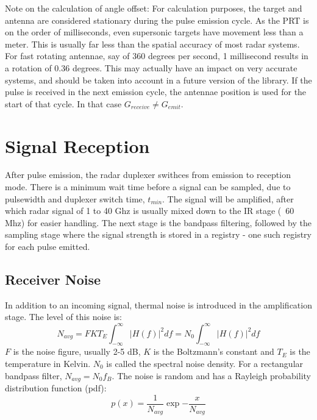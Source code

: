 \documentclass[letterpaper]{book}
\begin{document}
Note on the calculation of angle offset: For calculation purposes, the target and antenna are considered stationary during the pulse emission cycle. As the PRT is on the order of milliseconds, even supersonic targets have movement less than a meter. This is usually far less than the spatial accuracy of most radar systems. For fast rotating antennae, say of 360 degrees per second, 1 millisecond results in a rotation of 0.36 degrees. This may actually have an impact on very accurate systems, and should be taken into account in a future version of the library. If the pulse is received in the next emission cycle, the antennae position is used for the start of that cycle. In that case \(G_{receive} \neq G_{emit}\). 

\section{Signal Reception}
After pulse emission, the radar duplexer swithces from emission to reception mode. There is a minimum wait time before a signal can be sampled, due to pulsewidth and duplexer switch time, \(t_{min}\). The signal will be amplified, after which radar signal of 1 to 40 Ghz is usually mixed down to the IR stage (~60 Mhz) for easier handling. The next stage is the bandpass filtering, followed by the sampling stage where the signal strength is stored in a registry - one such registry for each pulse emitted. 

\subsection{Receiver Noise}
In addition to an incoming signal, thermal noise is introduced in the amplification stage. The level of this noise is:
\begin{equation} \label{eq:noise_power}
N_{avg} = FKT_{E}\int_{-\infty}^{\infty}{|H(f)|^{2}df}=N_{0}\int_{-\infty}^{\infty}{|H(f)|^{2}df}
\end{equation}
\(F\) is the noise figure, usually 2-5 dB, \(K\) is the Boltzmann's constant and \(T_{E}\) is the temperature in Kelvin. \(N_{0}\) is called the spectral noise density. For a rectangular bandpass filter, \(N_{avg}=N_{0}f_{B}\). The noise is random and has a Rayleigh probability distribution function (pdf): 
\begin{equation} \label{eq:Rayleigh_pdf}
p(x) = \frac{1}{N_{avg}} \exp{  - \frac{x}{N_{avg}}   }  
\end{equation}
\end{document}
